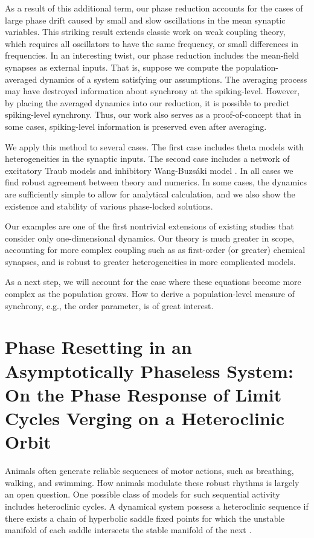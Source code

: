 \documentclass[a4paper,11pt]{article}
\begin{document}
As a result of this additional term, our phase reduction accounts for the cases of large phase drift caused by small and slow oscillations in the mean synaptic variables. This striking result extends classic work on weak coupling theory, which requires all oscillators to have the same frequency, or small differences in frequencies. In an interesting twist, our phase reduction includes the mean-field synapses as external inputs. That is, suppose we compute the population-averaged dynamics of a system satisfying our assumptions. The averaging process may have destroyed information about synchrony at the spiking-level. However, by placing the averaged dynamics into our reduction, it is possible to predict spiking-level synchrony. Thus, our work also serves as a proof-of-concept that in some cases, spiking-level information is preserved even after averaging.

We apply this method to several cases. The first case includes theta models \cite{ek84} with heterogeneities in the synaptic inputs. The second case includes a network of excitatory Traub models \cite{traub1982simulation} and inhibitory Wang-Buzs{\'a}ki model \cite{wang1996gamma}. In all cases we find robust agreement between theory and numerics. In some cases, the dynamics are sufficiently simple to allow for analytical calculation, and we also show the existence and stability of various phase-locked solutions.

Our examples are one of the first nontrivial extensions of existing studies that consider only one-dimensional dynamics. Our theory is much greater in scope, accounting for more complex coupling such as as first-order (or greater) chemical synapses, and is robust to greater heterogeneities in more complicated models.

As a next step, we will account for the case where these equations become more complex as the population grows. How to derive a population-level measure of synchrony, e.g., the order parameter, is of great interest.

\section{Phase Resetting in an Asymptotically Phaseless System: On the Phase Response of Limit Cycles Verging on a Heteroclinic Orbit}

Animals often generate reliable sequences of motor actions, such as breathing, walking, and swimming. How animals modulate these robust rhythms is largely an open question. One possible class of models for such sequential activity includes heteroclinic cycles. A dynamical system possess a heteroclinic sequence if there exists a chain of hyperbolic saddle fixed points for which the unstable manifold of each saddle intersects the stable manifold of the next \cite{shaw2012phase}.
\end{document}

